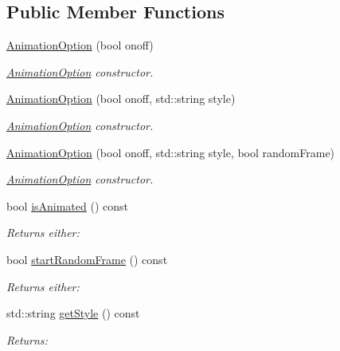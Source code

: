\subsection*{Public Member Functions}
\begin{DoxyCompactItemize}
\item 
\hyperlink{class_student_1_1_animation_option_aa876c7ba763dda2aef75c2b7382d5335}{Animation\-Option} (bool onoff)
\begin{DoxyCompactList}\small\item\em \hyperlink{class_student_1_1_animation_option}{Animation\-Option} constructor. \end{DoxyCompactList}\item 
\hyperlink{class_student_1_1_animation_option_a5c4ff4ea2fae2a2e4ff4df29cda5a2d8}{Animation\-Option} (bool onoff, std\-::string style)
\begin{DoxyCompactList}\small\item\em \hyperlink{class_student_1_1_animation_option}{Animation\-Option} constructor. \end{DoxyCompactList}\item 
\hyperlink{class_student_1_1_animation_option_a3093451ad2807303b5b38bf5da4e6fe3}{Animation\-Option} (bool onoff, std\-::string style, bool random\-Frame)
\begin{DoxyCompactList}\small\item\em \hyperlink{class_student_1_1_animation_option}{Animation\-Option} constructor. \end{DoxyCompactList}\item 
bool \hyperlink{class_student_1_1_animation_option_a62fc6873aace10124c68a6cedfa41c6d}{is\-Animated} () const 
\begin{DoxyCompactList}\small\item\em Returns either\-: \end{DoxyCompactList}\item 
bool \hyperlink{class_student_1_1_animation_option_a269b0ec0fbbb3d21573b9319d7475720}{start\-Random\-Frame} () const 
\begin{DoxyCompactList}\small\item\em Returns either\-: \end{DoxyCompactList}\item 
std\-::string \hyperlink{class_student_1_1_animation_option_af5ba14906c8d8c62ddccf97581482253}{get\-Style} () const 
\begin{DoxyCompactList}\small\item\em Returns\-: \end{DoxyCompactList}\end{DoxyCompactItemize}


